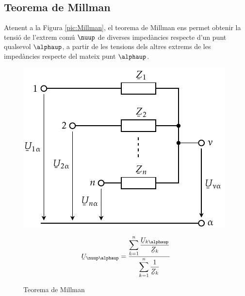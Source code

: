 \subsection{Teorema de Millman}

Atenent a la Figura \vref{pic:Millman}, el teorema
de Millman ens permet
obtenir la tensi\'{o} de l'extrem com\'{u} $\nuup$ de diverses imped\`{a}ncies respecte d'un punt
qualsevol $\alphaup$, a partir de les tensions dels altres extrems de les imped\`{a}ncies respecte
 del mateix punt $\alphaup$.

\begin{figure}[htb]
\hfill
\begin{minipage}[b]{7cm}
    \includegraphics{Imatges/Cap-Fonaments-Millman.pdf}
    \caption{Teorema de Millman} \label{pic:Millman}
\end{minipage}
\hfill
\begin{minipage}[b][4.5cm][t]{6cm}
    \begin{equation}
        \cmplx{U}_{\nuup\alphaup} = \frac{\displaystyle\sum_{k=1}^n \dfrac{\cmplx{U}_{k\alphaup}}{\cmplx{Z}_k}} {\displaystyle\sum_{k=1}^n \dfrac{1}{\cmplx{Z}_k}}
    \end{equation}
\end{minipage}
\end{figure}

